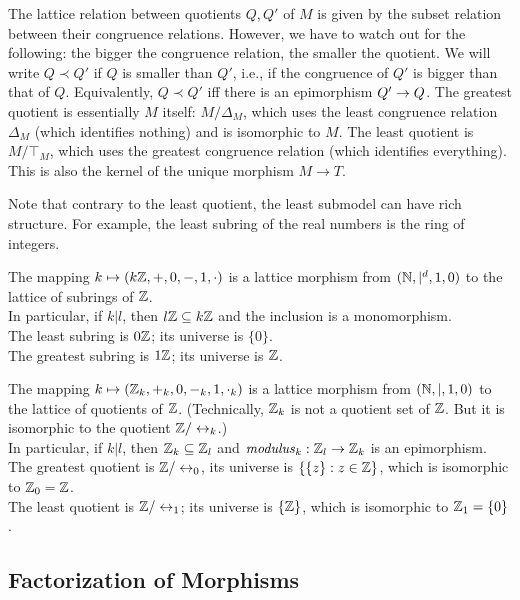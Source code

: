 The lattice relation between quotients $Q,Q'$ of $M$ is given by the subset relation between their congruence relations.
However, we have to watch out for the following: the bigger the congruence relation, the smaller the quotient.
We will write $Q\prec Q'$ if $Q$ is smaller than $Q'$, i.e., if the congruence of $Q'$ is bigger than that of $Q$.
Equivalently, $Q\prec Q'$ iff there is an epimorphism $Q'\rightarrow Q$.
The greatest quotient is essentially $M$ itself: $M/\Delta_M$, which uses the least congruence relation $\Delta_M$ (which identifies nothing) and is isomorphic to $M$.
The least quotient is $M/\top_M$, which uses the greatest congruence relation (which identifies everything).
This is also the kernel of the unique morphism $M\to T$.

Note that contrary to the least quotient, the least submodel can have rich structure.
For example, the least subring of the real numbers is the ring of integers.

\begin{example}\quad
\begin{compactitem}
\item The mapping $k\mapsto (k\mathbb{Z},+,0,-,1,\cdot)$ is a lattice morphism from $(\mathbb{N},|^d,1,0)$ to the lattice of subrings of $\mathbb{Z}$.\\
In particular, if $k|l$, then $l\mathbb{Z}\subseteq k\mathbb{Z}$ and the inclusion is a monomorphism.\\
The least subring is $0\mathbb{Z}$; its universe is $\{0\}$.\\
The greatest subring is $1\mathbb{Z}$; its universe is $\mathbb{Z}$.
\item The mapping $k\mapsto (\mathbb{Z}_k,+_k,0,-_k,1,\cdot_k)$ is a lattice morphism from $(\mathbb{N},|,1,0)$ to the lattice of quotients of $\mathbb{Z}$.
(Technically, $\mathbb{Z}_k$ is not a quotient set of $\mathbb{Z}$. But it is isomorphic to the quotient $\Z/\Equiv_k$.)\\
In particular, if $k|l$, then $\mathbb{Z}_k\subseteq \mathbb{Z}_l$ and $\mathit{modulus}_k:\mathbb{Z}_l\to\mathbb{Z}_k$ is an epimorphism.\\
The greatest quotient is $\Z/\Equiv_0$, its universe is $\{\{z\}:z\in \mathbb{Z}\}$, which is isomorphic to $\mathbb{Z}_0=\mathbb{Z}$.\\
The least quotient is $\Z/\Equiv_1$; its universe is $\{\mathbb{Z}\}$, which is isomorphic to $\mathbb{Z}_1=\{0\}$.
\end{compactitem}
\end{example}

\subsection{Factorization of Morphisms}

